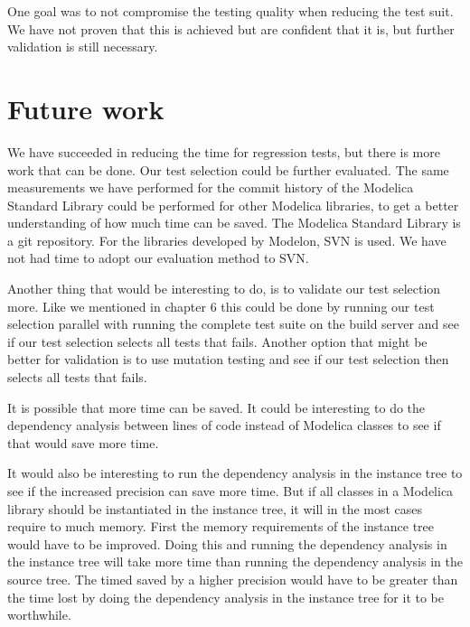 \documentclass{cslthse-msc}
\begin{document}
One goal was to not compromise the testing quality when reducing the test suit. We have not proven that this is achieved but are confident that it is, but further validation is still necessary.

\section{Future work}
We have succeeded in reducing the time for regression tests, but there is more work that can be done. Our test selection could be further evaluated. The same measurements we have performed for the commit history of the Modelica Standard Library could be performed for other Modelica libraries, to get a better understanding of how much time can be saved. The Modelica Standard Library is a git repository. For the libraries developed by Modelon, SVN is used. We have not had time to adopt our evaluation method to SVN.

Another thing that would be interesting to do, is to validate our test selection more. Like we mentioned in chapter 6 this could be done by running our test selection parallel with running the complete test suite on the build server and see if our test selection selects all tests that fails. Another option that might be better for validation is to use mutation testing and see if our test selection then selects all tests that fails.

It is possible that more time can be saved. It could be interesting to do the dependency analysis between lines of code instead of Modelica classes to see if that would save more time.

It would also be interesting to run the dependency analysis in the instance tree to see if the increased precision can save more time. But if all classes in a Modelica library should be instantiated in the instance tree, it will in the most cases require to much memory. First the memory requirements of the instance tree would have to be improved. Doing this and running the dependency analysis in the instance tree will take more time than running the dependency analysis in the source tree. The timed saved by a higher precision would have to be greater than the time lost by doing the dependency analysis in the instance tree for it to be worthwhile.

\printbibliography[heading=bibintoc]

\end{document}
